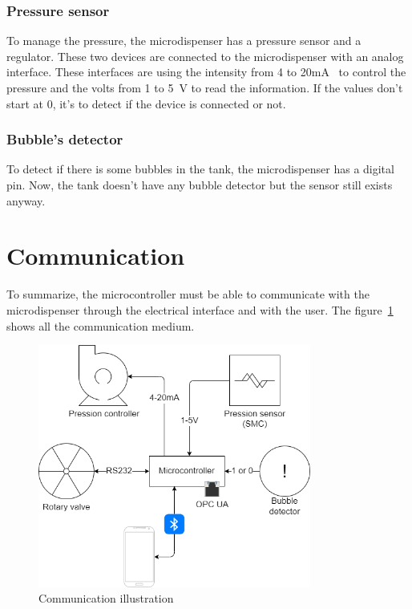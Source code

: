 \subsubsection{Pressure sensor}
\label{subsubsec:analog}
To manage the pressure, the microdispenser has a pressure sensor and a regulator.
These two devices are connected to the microdispenser with an analog interface.
These interfaces are using the intensity from 4 to 20mA~\cite{analog} to control the pressure and the volts from 1 to 5~V to read the information.
If the values don't start at 0, it's to detect if the device is connected or not.

\subsubsection{Bubble's detector}
\label{subsubsec:digital}
To detect if there is some bubbles in the tank, the microdispenser has a digital pin.
Now, the tank doesn't have any bubble detector but the sensor still exists anyway.


\section{Communication}
\label{sec:communication}

To summarize, the microcontroller must be able to communicate with the microdispenser through the electrical interface and with the user.
The figure~\ref{fig:analysis:communication:illustration} shows all the communication medium.

\begin{figure}[ht]
    \centering
    \includegraphics[width=0.8\textwidth]{img/communication.drawio}
    \caption{Communication illustration}
    \label{fig:analysis:communication:illustration}
\end{figure}

